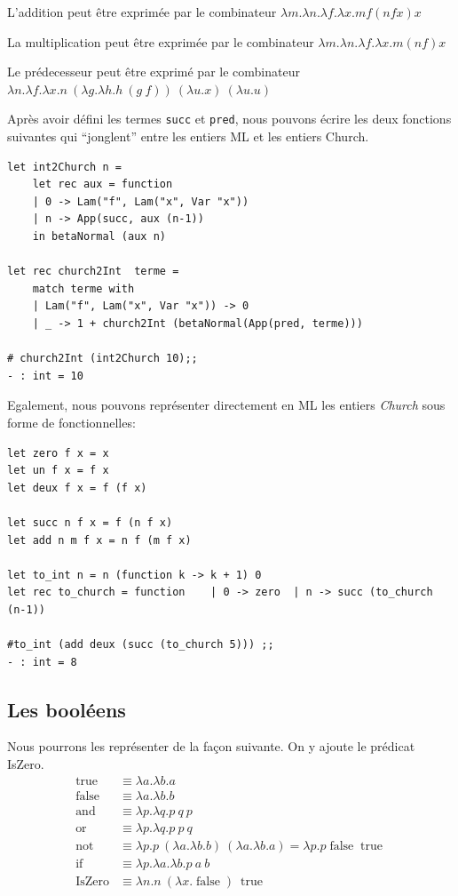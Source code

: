 \documentclass[11pt]{book}
\begin{document}
L'addition peut être  exprimée par le combinateur $\lambda m .\lambda n .\lambda f. \lambda x. m f (n f x) x$ 


La multiplication peut être exprimée par le combinateur $\lambda m .\lambda n .\lambda f. \lambda x. m (n f) x $ 


Le prédecesseur peut être exprimé par le combinateur $\lambda n.\lambda f.\lambda x.n\ (\lambda g.\lambda h.h\ (g\ f))\ (\lambda u.x)\ (\lambda u.u) $ 


Après avoir défini les termes \verb+succ+ et \verb+pred+, nous pouvons écrire les deux fonctions suivantes qui ``jonglent''
entre les entiers ML et les entiers Church.
\begin{Verbatim}
let int2Church n = 
	let rec aux = function
	| 0 -> Lam("f", Lam("x", Var "x"))
	| n -> App(succ, aux (n-1))
	in betaNormal (aux n)

let rec church2Int  terme = 
	match terme with
	| Lam("f", Lam("x", Var "x")) -> 0
	| _ -> 1 + church2Int (betaNormal(App(pred, terme)))

# church2Int (int2Church 10);;
- : int = 10
\end{Verbatim}


Egalement, nous pouvons représenter directement en ML les entiers \textit{Church} sous forme de fonctionnelles:
\begin{Verbatim}
let zero f x = x
let un f x = f x
let deux f x = f (f x)

let succ n f x = f (n f x)
let add n m f x = n f (m f x)

let to_int n = n (function k -> k + 1) 0
let rec to_church = function	| 0 -> zero  | n -> succ (to_church (n-1))
	
#to_int (add deux (succ (to_church 5))) ;;
- : int = 8	
\end{Verbatim}

\subsection{Les booléens }
Nous pourrons les représenter de la façon suivante. On y ajoute le prédicat IsZero.
$$
\begin{array}{ll}
\operatorname {true} &\equiv \lambda a.\lambda b.a \\
\operatorname {false} &\equiv \lambda a.\lambda b.b \\
\operatorname {and} &\equiv \lambda p.\lambda q.p\ q\ p\\
\operatorname {or} &\equiv \lambda p.\lambda q.p\ p\ q\\
\operatorname {not} &\equiv \lambda p.p\ (\lambda a.\lambda b.b)\ (\lambda a.\lambda b.a)=\lambda p.p\operatorname {false} \operatorname {true} \\
\operatorname {if} &\equiv \lambda p.\lambda a.\lambda b.p\ a\ b  \\
\operatorname{IsZero} &\equiv  \lambda n.n\ (\lambda x.\operatorname{false})\ \operatorname{true}
\end{array}
$$
\end{document}
